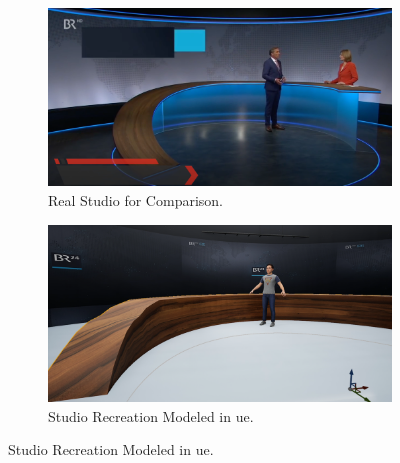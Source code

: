 \documentclass[
  a4paper,  %
  twoside,  %
  bibliography=totoc,
  headsepline,
  cleardoublepage=empty,
  parskip=half,
  draft=false
]{scrbook}
\begin{document}
\begin{figure}[h]
  \centering
  \begin{subfigure}{0.45\textwidth}
    \includegraphics[width=\linewidth]{graphics/unreal-engine/studio/Studio-real.png}
    \caption{Real Studio for Comparison.}
  \end{subfigure}
  \begin{subfigure}{0.45\textwidth}
    \includegraphics[width=\linewidth]{graphics/unreal-engine/studio/Studio-Comparison.png}
    \caption{Studio Recreation Modeled in \gls{ue}.}
  \end{subfigure}


\end{figure}
\end{document}
